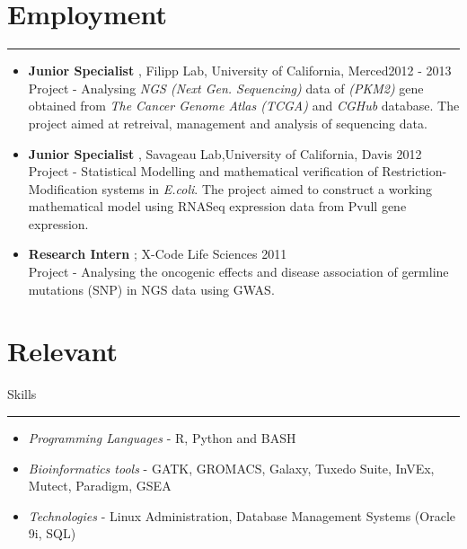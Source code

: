 \documentclass[line,margin]{resume_type2}
\begin{document}
\begin{resume}
\section{Employment}\hskip 4pt {\hfill \color{gray} \rule{14.3 cm}{0.1pt}}
\begin{itemize}
                \item[]
                \vskip 3pt
                \textbf{Junior Specialist} , Filipp Lab,  University of California, Merced{\color{gray}\hfill   2012 - 2013}\\
                {\small {Project }- Analysing {\it\small{NGS (Next Gen. Sequencing)}} data of {\it\small{ (PKM2)}} gene obtained from {\it The Cancer Genome Atlas {\small{(TCGA)}}} and {\it{\small{CGHub}}} database. The project aimed at retreival, management and analysis of sequencing data. }
                \vskip 5pt
                \item[]
                \textbf{Junior Specialist} , {Savageau Lab},University of California, Davis {\color{gray} \hfill 2012}\\
                {\small {Project} - Statistical Modelling and mathematical verification  of Restriction-Modification systems in {\it E.coli}. The project aimed to construct a working mathematical model using RNASeq expression data from Pvull gene expression.}
                \vskip 5pt
                \item[]
                \textbf{Research Intern }{; X-Code Life Sciences} {\color{gray} \hfill 2011}\\
                {\small Project - Analysing the oncogenic effects and disease association of germline mutations (SNP) in NGS data using GWAS.}
                \vskip 10pt
                \end{itemize}
                
                
\section{Relevant}\hskip 60pt {\large \sc Skills} \hskip 4pt {\color {gray} \hfill \rule {13.6cm} {0.1pt}}
\begin{itemize}
\vskip 3pt
                \item[]
                 {\it{Programming Languages}} -  R, Python {\small {and BASH}}
                 \vskip 2pt
                \item[] 
                 {{\it{Bioinformatics tools}} - {\small {GATK, GROMACS}}, Galaxy, Tuxedo Suite, InVEx, Mutect, Paradigm, GSEA}
                 \vskip 2pt
                \item[]
                 {\it{Technologies}} - Linux Administration, Database Management Systems (Oracle 9i,  SQL)
                \vskip 10pt
\end{itemize}
                

\end{resume}
\end{document}

